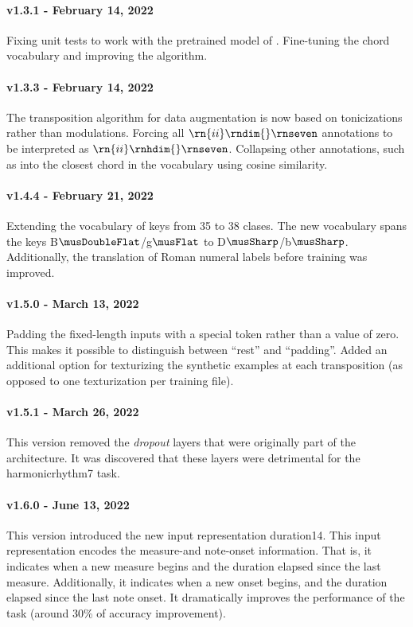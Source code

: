 \paragraph{v1.3.1 - February 14, 2022}
Fixing unit tests to work with the pretrained model of
. Fine-tuning the chord vocabulary and
improving the  algorithm.

\paragraph{v1.3.3 - February 14, 2022}
The transposition algorithm for data augmentation is now
based on tonicizations rather than modulations. Forcing all
$\rn{ii}\rndim{}\rnseven$ annotations to be interpreted as
$\rn{ii}\rnhdim{}\rnseven$. Collapsing other annotations,
such as  into the closest chord in the vocabulary
using cosine similarity.

\paragraph{v1.4.4 - February 21, 2022}
Extending the vocabulary of keys from 35 to 38 clases. The
new vocabulary spans the keys B$\musDoubleFlat$/g$\musFlat$
to D$\musSharp$/b$\musSharp$. Additionally, the translation
of Roman numeral labels before training was improved.

\paragraph{v1.5.0 - March 13, 2022}
Padding the fixed-length inputs with a special token rather
than a value of zero. This makes it possible to distinguish
between ``rest'' and ``padding''. Added an additional option
for texturizing the synthetic examples at each transposition
(as opposed to one texturization per training file).

\paragraph{v1.5.1 - March 26, 2022}
This version removed the \emph{dropout} layers
\parencite{dahl2013improving} that were originally part of
the architecture. It was discovered that these layers were
detrimental for the \gls{harmonicrhythm7} task.

\paragraph{v1.6.0 - June 13, 2022}
This version introduced the new input representation
\gls{duration14}. This input representation encodes the
measure-and note-onset information. That is, it indicates
when a new measure begins and the duration elapsed since the
last measure. Additionally, it indicates when a new onset
begins, and the duration elapsed since the last note onset.
It dramatically improves the performance of the
 task (around 30\% of accuracy
improvement).

